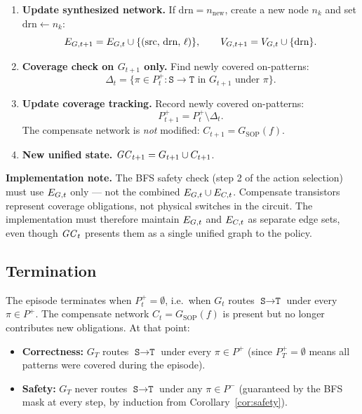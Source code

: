 \documentclass[11pt, a4paper]{article}
\theoremstyle{plain}
\theoremstyle{definition}
\theoremstyle{remark}
\newcommand{\SOURCE}{\texttt{S}}
\newcommand{\SINK}{\texttt{T}}
\newcommand{\Pplus}{P^{+}}
\newcommand{\Pminus}{P^{-}}
\newcommand{\VG}[1][]{V_{G\if\relax\detokenize{#1}\relax\else,#1\fi}}
\newcommand{\EG}[1][]{E_{G\if\relax\detokenize{#1}\relax\else,#1\fi}}
\newcommand{\EC}[1][]{E_{C\if\relax\detokenize{#1}\relax\else,#1\fi}}
\newcommand{\GC}[1][]{\mathit{GC}\if\relax\detokenize{#1}\relax\else_{#1}\fi}
\newcommand{\nnew}{n_{\mathrm{new}}}
\begin{document}
\begin{enumerate}[leftmargin=1.8em, label=\textbf{\arabic*.}]
  \item \textbf{Update synthesized network.}
    If $\mathrm{drn} = \nnew$, create a new node $n_k$ and
    set $\mathrm{drn} \leftarrow n_k$:
    \[
      \EG[t{+}1] = \EG[t] \cup \{(\mathrm{src},\,\mathrm{drn},\,\ell)\},
      \qquad
      \VG[t{+}1] = \VG[t] \cup \{\mathrm{drn}\}.
    \]

  \item \textbf{Coverage check on $G_{t+1}$ only.}
    Find newly covered on-patterns:
    \[
      \Delta_t
      = \bigl\{\pi \in \Pplus_t :
          \SOURCE \to \SINK
          \text{ in } G_{t+1} \text{ under } \pi
        \bigr\}.
    \]

  \item \textbf{Update coverage tracking.}
    Record newly covered on-patterns:
    \[
      \Pplus_{t+1} = \Pplus_t \setminus \Delta_t.
    \]
    The compensate network is \emph{not} modified:
    $C_{t+1} = G_{\mathrm{SOP}}(f)$.

  \item \textbf{New unified state.}
    $\GC[t{+}1] = G_{t+1} \cup C_{t+1}$.
\end{enumerate}

\begin{notebox}
\textbf{Implementation note.}
The BFS safety check (step 2 of the action selection) must use
$\EG[t]$ only — not the combined $\EG[t] \cup \EC[t]$.  Compensate
transistors represent coverage obligations, not physical switches in
the circuit.  The implementation must therefore maintain $\EG[t]$ and
$\EC[t]$ as separate edge sets, even though $\GC[t]$ presents them
as a single unified graph to the policy.
\end{notebox}

\subsection{Termination}

The episode terminates when $\Pplus_t = \emptyset$, i.e.\ when
$G_t$ routes $\SOURCE \to \SINK$ under every $\pi \in \Pplus$.
The compensate network $C_t = G_{\mathrm{SOP}}(f)$ is present but
no longer contributes new obligations.  At that point:
\begin{itemize}[leftmargin=1.5em, itemsep=2pt]
  \item \textbf{Correctness:} $G_T$ routes $\SOURCE \to \SINK$ under
    every $\pi \in \Pplus$ (since $\Pplus_T = \emptyset$ means all
    patterns were covered during the episode).
  \item \textbf{Safety:} $G_T$ never routes $\SOURCE \to \SINK$
    under any $\pi \in \Pminus$ (guaranteed by the BFS mask at every
    step, by induction from Corollary~\ref{cor:safety}).
\end{itemize}
\end{document}
